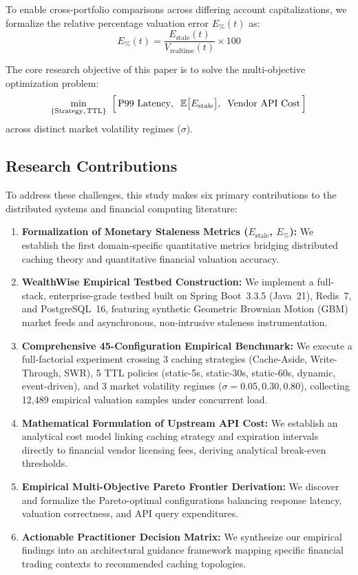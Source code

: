 \documentclass[11pt,a4paper]{article}
\begin{document}
To enable cross-portfolio comparisons across differing account capitalizations, we formalize the relative percentage valuation error $E_{\%}(t)$ as:
\begin{equation}
  E_{\%}(t) = \frac{E_{\text{stale}}(t)}{V_{\text{realtime}}(t)} \times 100
  \label{eq:epct}
\end{equation}

The core research objective of this paper is to solve the multi-objective optimization problem:
\begin{equation}
  \min_{\{\text{Strategy},\,\text{TTL}\}} \;\; \Bigl[\, \text{P99 Latency}, \;\; \mathbb{E}\bigl[E_{\text{stale}}\bigr], \;\; \text{Vendor API Cost} \, \Bigr]
  \label{eq:optimization}
\end{equation}
across distinct market volatility regimes ($\sigma$).

\subsection{Research Contributions}

To address these challenges, this study makes six primary contributions to the distributed systems and financial computing literature:

\begin{enumerate}[label=\textbf{C\arabic*.}]
  \item \textbf{Formalization of Monetary Staleness Metrics ($E_{\text{stale}}$, $E_{\%}$):} We establish the first domain-specific quantitative metrics bridging distributed caching theory and quantitative financial valuation accuracy.
  \item \textbf{WealthWise Empirical Testbed Construction:} We implement a full-stack, enterprise-grade testbed built on Spring Boot~3.3.5 (Java~21), Redis~7, and PostgreSQL~16, featuring synthetic Geometric Brownian Motion (GBM) market feeds and asynchronous, non-intrusive staleness instrumentation.
  \item \textbf{Comprehensive 45-Configuration Empirical Benchmark:} We execute a full-factorial experiment crossing 3 caching strategies (Cache-Aside, Write-Through, SWR), 5 TTL policies (static-5s, static-30s, static-60s, dynamic, event-driven), and 3 market volatility regimes ($\sigma = 0.05, 0.30, 0.80$), collecting 12{,}489 empirical valuation samples under concurrent load.
  \item \textbf{Mathematical Formulation of Upstream API Cost:} We establish an analytical cost model linking caching strategy and expiration intervals directly to financial vendor licensing fees, deriving analytical break-even thresholds.
  \item \textbf{Empirical Multi-Objective Pareto Frontier Derivation:} We discover and formalize the Pareto-optimal configurations balancing response latency, valuation correctness, and API query expenditures.
  \item \textbf{Actionable Practitioner Decision Matrix:} We synthesize our empirical findings into an architectural guidance framework mapping specific financial trading contexts to recommended caching topologies.
\end{enumerate}
\end{document}
